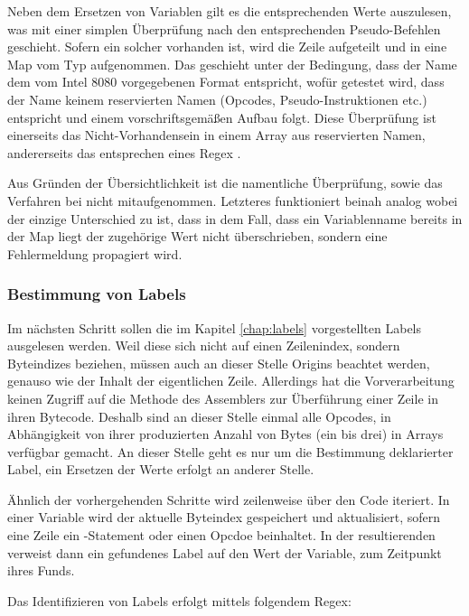 Neben dem Ersetzen von Variablen gilt es die entsprechenden Werte auszulesen, was mit einer simplen Überprüfung nach den entsprechenden Pseudo-Befehlen geschieht. Sofern ein solcher vorhanden ist, wird die Zeile aufgeteilt und in eine Map vom Typ  aufgenommen. Das geschieht unter der Bedingung, dass der Name dem vom Intel 8080 vorgegebenen Format entspricht, wofür getestet wird, dass der Name keinem reservierten Namen (Opcodes, Pseudo-Instruktionen etc.) entspricht und einem vorschriftsgemäßen Aufbau folgt. Diese Überprüfung ist einerseits das Nicht-Vorhandensein in einem Array aus reservierten Namen, andererseits das entsprechen eines Regex .

Aus Gründen der Übersichtlichkeit ist die namentliche Überprüfung, sowie das Verfahren bei  nicht mitaufgenommen. Letzteres funktioniert beinah analog wobei der einzige Unterschied zu  ist, dass in dem Fall, dass ein Variablenname bereits in der Map liegt der zugehörige Wert nicht überschrieben, sondern eine Fehlermeldung propagiert wird.

\subsubsection{Bestimmung von Labels}

Im nächsten Schritt sollen die im Kapitel \ref{chap:labels} vorgestellten Labels ausgelesen werden. Weil diese sich nicht auf einen Zeilenindex, sondern Byteindizes beziehen, müssen auch an dieser Stelle Origins beachtet werden, genauso wie der Inhalt der eigentlichen Zeile. Allerdings hat die Vorverarbeitung keinen Zugriff auf die Methode  des Assemblers zur Überführung einer Zeile in ihren Bytecode. Deshalb sind an dieser Stelle einmal alle Opcodes, in Abhängigkeit von ihrer produzierten Anzahl von Bytes (ein bis drei) in Arrays verfügbar gemacht. An dieser Stelle geht es nur um die Bestimmung deklarierter Label, ein Ersetzen der Werte erfolgt an anderer Stelle.

Ähnlich der vorhergehenden Schritte wird zeilenweise über den Code iteriert. In einer Variable  wird der aktuelle Byteindex gespeichert und aktualisiert, sofern eine Zeile ein -Statement oder einen Opcdoe beinhaltet. In der resultierenden  verweist dann ein gefundenes Label auf den Wert der Variable, zum Zeitpunkt ihres Funds.

Das Identifizieren von Labels erfolgt mittels folgendem Regex:

